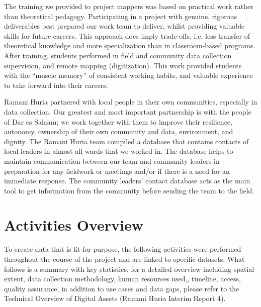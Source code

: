 \documentclass[a4paper,12pt,twoside]{article}
\begin{document}
\begin{multicols}{2}
The training we provided to project mappers was based on practical work rather than theoretical pedagogy. Participating in a project with genuine, rigorous deliverables best prepared our work team to deliver, whilst providing valuable skills for future careers. This approach does imply trade-offs, i.e. less transfer of theoretical knowledge and more specialization than in classroom-based programs. After training, students performed in field and community data collection supervision, and remote mapping (digitization). This work provided students with the “muscle memory” of consistent working habits, and valuable experience to take forward into their careers.

Ramani Huria partnered with local people in their own communities, especially in data collection. Our greatest and most important partnership is with the people of Dar es Salaam; we work together with them to improve their resilience, autonomy, ownership of their own community and data, environment, and dignity. The Ramani Huria team compiled a database that contains contacts of local leaders in almost all wards that we worked in. The database helps to maintain communication between our team and community leaders in preparation for any fieldwork or meetings and/or if there is a need for an immediate response. The community leaders’ contact database acts as the main tool to get information from the community before sending the team to the field.
\end{multicols}

\newpage
\section{Activities Overview}
\begin{multicols}{2}
To create data that is fit for purpose, the following activities were performed throughout the course of the project and are linked to specific datasets. What follows is a summary with key statistics, for a detailed overview including spatial extent, data collection methodology, human resources used,, timeline, access, quality assurance, in addition to use cases and data gaps, please refer to the Technical Overview of Digital Assets (Ramani Huria Interim Report 4). 
\end{multicols}
\end{document}
